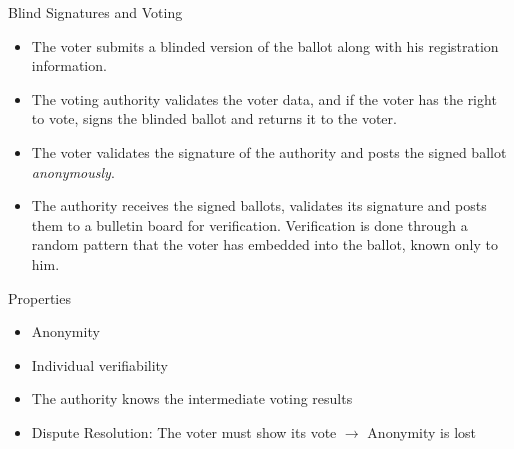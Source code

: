 \documentclass{beamer}
\begin{document}
\begin{frame}[allowframebreaks]{Blind Signatures and Voting \cite{chaum83blindsign}}

\begin{itemize}
\item The voter submits a blinded version of the ballot along with his registration information. 
\item The voting authority validates the voter data, and if the voter has the right to vote, signs the blinded ballot and returns it to the voter. 
\item The voter validates the signature of the authority and posts the signed ballot \textit{anonymously}. 
\item The authority receives the signed ballots, validates its signature and posts them to a bulletin board for verification. Verification is done through a random pattern that the voter has embedded into the ballot, known only to him.
\end{itemize}

\begin{block}{Properties}
\begin{itemize}
\item Anonymity
\item Individual verifiability
\item The authority knows the intermediate voting results
\item Dispute Resolution: The voter must show its vote $\rightarrow$ Anonymity is lost
\end{itemize}
\end{block}
\end{frame}
\end{document}
